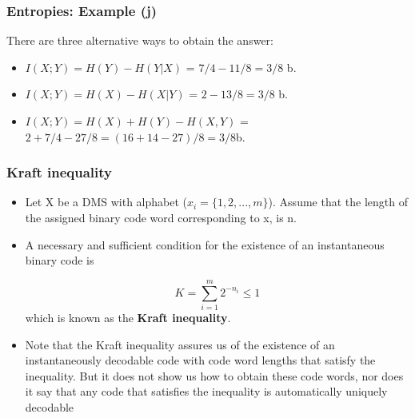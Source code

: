 ﻿\documentclass[a4]{beamer}
\begin{document}
\begin{frame}
\frametitle{Entropies: Example (j)}
There are three alternative ways to obtain the answer:
\begin{itemize}
\item $I(X; Y ) = H(Y ) - H(Y |X)$ = $7/4 - 11/8 = 3/8$ b.
\item $I(X; Y ) = H(X) - H(X|Y)$ = $2 - 13/8 = 3/8$ b.
\item $I(X; Y ) = H(X) + H(Y ) - H(X,Y )$ = $2 + 7/4 - 27/8 = (16+14-27)/8 = 3/8$b.
\end{itemize}
\end{frame}




\begin{frame}
\frametitle{ Kraft inequality}
\begin{itemize}
\item Let X be a DMS with alphabet ($x _i = \{1, 2, . . . ,m\}$). Assume that the length of the assigned binary
code word corresponding to x, is n.
\item A necessary and sufficient condition for the existence of an instantaneous binary code is

 \[ K = \sum^{m}_{i=1}2^{-n_i} \leq 1 \]
which is known as the \textbf{Kraft inequality}.
\item Note that the Kraft inequality assures us of the existence of an instantaneously decodable code
with code word lengths that satisfy the inequality. But it does not show us how to obtain these code
words, nor does it say that any code that satisfies the inequality is automatically uniquely decodable
\end{itemize}
\end{frame}


\end{document}
